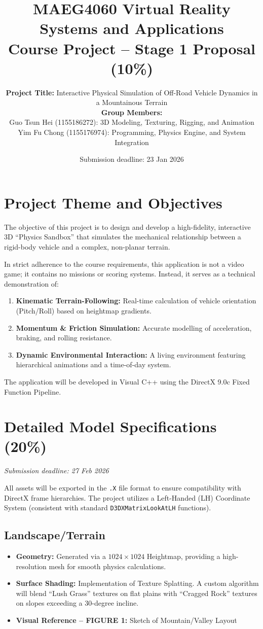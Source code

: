 \documentclass[11pt,a4paper]{article}
\title{%
  MAEG4060 Virtual Reality Systems and Applications\\
  \large Course Project -- Stage 1 Proposal (10\%)}
\author{%
  \parbox{0.92\linewidth}{\centering
  \textbf{Project Title:} Interactive Physical Simulation of Off-Road Vehicle Dynamics in a Mountainous Terrain\\[1em]
  \textbf{Group Members:}\\[0.35em]
  Guo Tsun Hei (1155186272): 3D Modeling, Texturing, Rigging, and Animation\\
  Yim Fu Chong (1155176974): Programming, Physics Engine, and System Integration}}
\date{Submission deadline: 23 Jan 2026}
\begin{document}
\maketitle

\section{Project Theme and Objectives}

The objective of this project is to design and develop a high-fidelity, interactive 3D ``Physics Sandbox'' that simulates the mechanical relationship between a rigid-body vehicle and a complex, non-planar terrain.

In strict adherence to the course requirements, this application is not a video game; it contains no missions or scoring systems. Instead, it serves as a technical demonstration of:

\begin{enumerate}
  \item \textbf{Kinematic Terrain-Following:} Real-time calculation of vehicle orientation (Pitch/Roll) based on heightmap gradients.
  \item \textbf{Momentum \& Friction Simulation:} Accurate modelling of acceleration, braking, and rolling resistance.
  \item \textbf{Dynamic Environmental Interaction:} A living environment featuring hierarchical animations and a time-of-day system.
\end{enumerate}

The application will be developed in Visual C++ using the DirectX 9.0c Fixed Function Pipeline.

\section{Detailed Model Specifications (20\%)}

\textit{Submission deadline: 27 Feb 2026}

All assets will be exported in the \texttt{.X} file format to ensure compatibility with DirectX frame hierarchies. The project utilizes a Left-Handed (LH) Coordinate System (consistent with standard \texttt{D3DXMatrixLookAtLH} functions).

\subsection{Landscape/Terrain}

\begin{itemize}
  \item \textbf{Geometry:} Generated via a $1024\times 1024$ Heightmap, providing a high-resolution mesh for smooth physics calculations.
  \item \textbf{Surface Shading:} Implementation of Texture Splatting. A custom algorithm will blend ``Lush Grass'' textures on flat plains with ``Cragged Rock'' textures on slopes exceeding a 30-degree incline.
  \item \textbf{Visual Reference -- FIGURE 1:} Sketch of Mountain/Valley Layout
\end{itemize}
\end{document}
